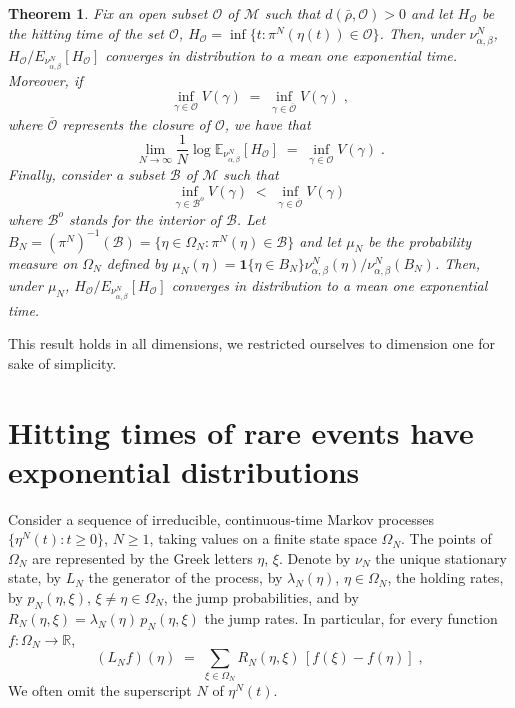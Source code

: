 \documentclass[reqno]{amsart}
\newtheorem{theorem}{Theorem}[section]
\begin{document}
\begin{theorem}
\label{s16}
Fix an open subset ${{\mathscr O}}$ of ${{\mathscr M}}$ such that $d(\bar\rho, {{\mathscr O}})>0$
and let $H_{{{\mathscr O}}}$ be the hitting time of the set ${{\mathscr O}}$, $H_{{{\mathscr O}}}= \inf\{t : \pi^N(\eta(t)) \in {{\mathscr O}}\}$. Then, under
$\nu^N_{\alpha, \beta}$, $H_{{{\mathscr O}}}/E_{\nu^N_{\alpha, \beta}} [H_{{{\mathscr O}}}]$ converges in distribution to a mean one exponential
time. Moreover, if 
\begin{equation*}
\inf_{\gamma\in{{\mathscr O}}} V(\gamma) \;=\; 
\inf_{\gamma\in\overline{{{\mathscr O}}}} V(\gamma)\;,
\end{equation*}
where $\overline{{{\mathscr O}}}$ represents the closure of ${{\mathscr O}}$, we have
that
\begin{equation*}
\lim_{N\to\infty} \frac 1N \log 
{{\mathbb E}}_{\nu^N_{\alpha, \beta}}[H_{{{\mathscr O}}}] \;=\; \inf_{\gamma\in{{\mathscr O}}} V(\gamma)\;.
\end{equation*}
Finally, consider a subset ${{\mathscr B}}$ of ${{\mathscr M}}$ such that
\begin{equation}
\label{23}
\inf_{\gamma\in {{\mathscr B}}^o} V(\gamma) \;<\; 
\inf_{\gamma\in \overline{{{\mathscr O}}}} V(\gamma)\,
\end{equation} 
where ${{\mathscr B}}^o$ stands for the interior of ${{\mathscr B}}$.  Let $B_N =
(\pi^N)^{-1}({{\mathscr B}}) = \{\eta\in\Omega_N : \pi^N(\eta)\in {{\mathscr B}}\}$ and
let $\mu_N$ be the probability measure on $\Omega_N$ defined by
$\mu_N(\eta) = {{\mathbf 1}}\{\eta\in B_N\} \nu^N_{\alpha,
  \beta}(\eta)/\nu^N_{\alpha, \beta}(B_N)$. Then, under $\mu_N$,
$H_{{{\mathscr O}}}/E_{\nu^N_{\alpha, \beta}} [H_{{{\mathscr O}}}]$ converges in
distribution to a mean one exponential time.
\end{theorem}

This result holds in all dimensions, we restricted ourselves to
dimension one for sake of simplicity.

\section{Hitting times of rare events have exponential distributions}
\label{sec2}

Consider a sequence of irreducible, continuous-time Markov processes
$\{\eta^N(t) : t\ge 0\}$, $N\ge 1$, taking values on a finite state
space $\Omega_N$. The points of $\Omega_N$ are represented by the
Greek letters $\eta$, $\xi$. Denote by $\nu_N$ the unique stationary
state, by $L_N$ the generator of the process, by $\lambda_N(\eta)$,
$\eta\in \Omega_N$, the holding rates, by $p_N(\eta,\xi)$,
$\xi\not=\eta\in \Omega_N$, the jump probabilities, and by
$R_N(\eta,\xi) = \lambda _N(\eta)\, p_N(\eta,\xi)$ the jump rates. In
particular, for every function $f:\Omega_N\to {{\mathbb R}}$,
\begin{equation*}
(L_N f)(\eta) \;=\; \sum_{\xi\in\Omega_N} R_N(\eta,\xi) \,[f(\xi) -
f(\eta)]\; ,
\end{equation*}
We often omit the superscript $N$ of $\eta^N(t)$.
\end{document}
